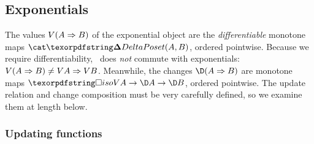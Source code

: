 





\subsection{Exponentials}
\label{sec:CP-exponentials}

The values $V{(A \Rightarrow B)}$ of the exponential object are the
\emph{differentiable} monotone maps $\CP(A, B)$, ordered pointwise. Because we
require differentiability, \valfn\ does \emph{not} commute with exponentials:
$V{(A \Rightarrow B)} \ne V A \Rightarrow V B$.
%
Meanwhile, the changes $\chgs{(\expO A B)}$ are monotone maps $\isof{\vals A}
\to \chgs A \to \chgs B$, ordered pointwise. The update relation and change
composition must be very carefully defined, so we examine them at length below.

\subsubsection{Updating functions}

